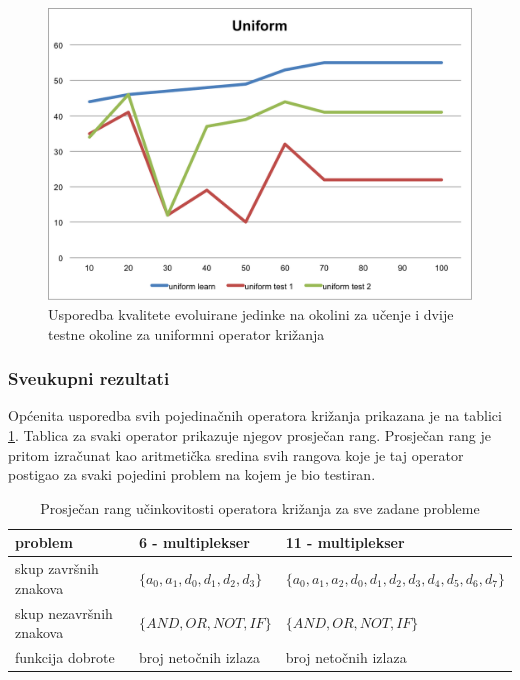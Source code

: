 \begin{figure}[H]
	\centering
	\includegraphics[scale=0.8]{./slike/cross-validation/uniform.png}
	\caption{Usporedba kvalitete evoluirane jedinke na okolini za učenje i dvije testne okoline za uniformni operator križanja}
	\label{uniform}
\end{figure}


\subsubsection{Sveukupni rezultati}
Općenita usporedba svih pojedinačnih operatora križanja prikazana je na tablici \ref{overAllTable}. Tablica za svaki operator prikazuje njegov prosječan rang. Prosječan rang je pritom izračunat kao aritmetička sredina svih rangova koje je taj operator postigao za svaki pojedini problem na kojem je bio testiran.

\begin{table}[H]
 	\centering

    \begin{tabular}{| l | l | l |}
    \hline
   problem & 6 - multiplekser & 11 - multiplekser \\ \hline
   skup završnih znakova & $\{a_0, a_1, d_0, d_1, d_2, d_3 \}$ & $\{a_0, a_1, a_2, d_0, d_1, d_2, d_3, d_4, d_5, d_6, d_7 \}$\\ \hline
   skup nezavršnih znakova & $\{ AND, OR, NOT, IF \}$  & $\{ AND, OR, NOT, IF \}$ \\ \hline
   funkcija dobrote & broj netočnih izlaza & broj netočnih izlaza \\ \hline
    \end{tabular}
    
    \caption{Prosječan rang učinkovitosti operatora križanja za sve zadane probleme}
    \label{overAllTable}
\end{table}


